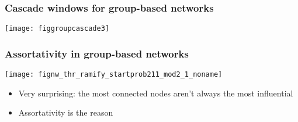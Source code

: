 \begin{frame}
  \frametitle{Cascade windows for group-based networks}

  \texttt{[image: figgroupcascade3]}\\

\end{frame}


\begin{frame}
  \frametitle{Assortativity in group-based networks}

  \centering

  \texttt{[image: fignw\_thr\_ramify\_startprob211\_mod2\_1\_noname]}

  \begin{itemize}
  \item<2-> Very surprising: the most connected nodes aren't always the most influential
  \item<3-> \alert{Assortativity} is the reason
  \end{itemize}
  
\end{frame}

